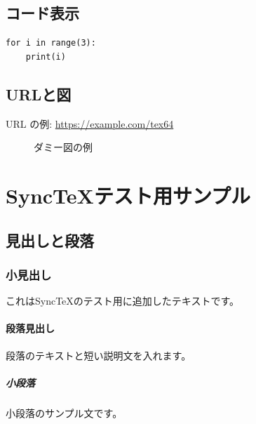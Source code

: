 \documentclass{ltjsarticle}
\theoremstyle{definition}
\begin{document}
\subsection{コード表示}
\begin{verbatim}
for i in range(3):
    print(i)
\end{verbatim}

\subsection{URLと図}
URL の例: \url{https://example.com/tex64}
\begin{figure}[htbp]
  \centering
  \fbox{\rule{0pt}{120pt}\rule{180pt}{0pt}}
  \caption{ダミー図の例}
\end{figure}

\section{SyncTeXテスト用サンプル}
\subsection{見出しと段落}
\subsubsection{小見出し}
これはSyncTeXのテスト用に追加したテキストです。
\paragraph{段落見出し}
段落のテキストと短い説明文を入れます。
\subparagraph{小段落}
小段落のサンプル文です。
\end{document}
